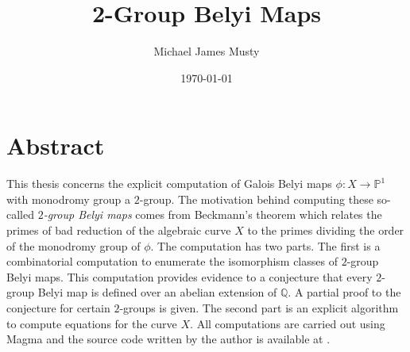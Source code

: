 \documentclass{dcthesis}
\title{2-Group Belyi Maps}
\author{Michael James Musty}
\date{\today}
\newcommand{\PP}{\mathbb P}
\newcommand{\QQ}{\mathbb Q}
\newcommand{\mm}[1]{{\color{blue} \sf MM: [#1]}}
\numberwithin{equation}{section}
\theoremstyle{definition}
\theoremstyle{remark}
\begin{document}
\frontmatter

\maketitle

\chapter*{Abstract}
This thesis concerns the explicit computation
of Galois Belyi maps
$\phi\colon X\to\PP^1$
with monodromy group
a $2$-group.
The motivation behind computing
these so-called
\emph{
$2$-group Belyi maps
}
comes from
Beckmann's theorem
\cite{beckmann}
which relates the primes of bad
reduction of the algebraic curve
$X$ to the primes
dividing the
order of the
monodromy group of $\phi$.
The computation has two parts.
The first is a combinatorial computation
to enumerate the isomorphism classes
of $2$-group Belyi maps.
This computation provides evidence to
a conjecture that every $2$-group
Belyi map is defined over an abelian
extension of $\QQ$.
A partial proof to the
conjecture for certain $2$-groups is given.
The second part is an explicit algorithm
to compute equations for the curve
$X$.
All computations are carried out using
\textsf{Magma}
\cite{magma}
and the source code
written by the author
is available at
\cite{twogroupdessins}.



\tableofcontents


\listoffigures

\mainmatter
\end{document}
